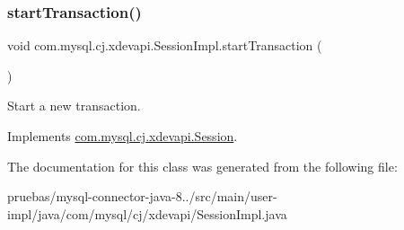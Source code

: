 \mbox{\label{classcom_1_1mysql_1_1cj_1_1xdevapi_1_1_session_impl_a765f8d81a34ca32d608bdeb5e56e3119}} 
\subsubsection{\texorpdfstring{start\+Transaction()}{startTransaction()}}
{\footnotesize\ttfamily void com.\+mysql.\+cj.\+xdevapi.\+Session\+Impl.\+start\+Transaction (\begin{DoxyParamCaption}{ }\end{DoxyParamCaption})}

Start a new transaction. 

Implements \mbox{\hyperlink{interfacecom_1_1mysql_1_1cj_1_1xdevapi_1_1_session_a1c0d0951a9c3f1d92f9bd22f337dd86c}{com.\+mysql.\+cj.\+xdevapi.\+Session}}.



The documentation for this class was generated from the following file\+:\begin{DoxyCompactItemize}
\item 
pruebas/mysql-\/connector-\/java-\/8../src/main/user-\/impl/java/com/mysql/cj/xdevapi/Session\+Impl.\+java\end{DoxyCompactItemize}

